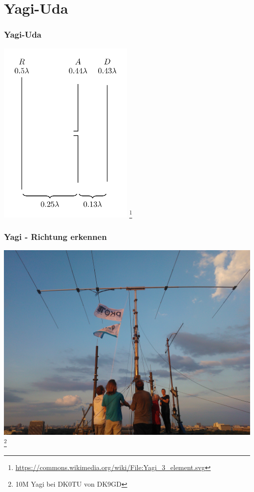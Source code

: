 \section*{Yagi-Uda}

\begin{frame}
    \frametitle{Yagi-Uda}
    \begin{center}
        \includegraphics[width=0.5\textwidth]{e11/Yagi_3_element.png}
        \footnote{\tiny \url{https://commons.wikimedia.org/wiki/File:Yagi_3_element.svg}}
	\end{center}
\end{frame}

\begin{frame}
    \frametitle{Yagi - Richtung erkennen}
    \begin{center}
        \includegraphics[width=.9\textwidth]{e11/yagi.jpg}
        \footnote{\tiny 10M Yagi bei DK0TU von DK9GD}
	\end{center}
\end{frame}


